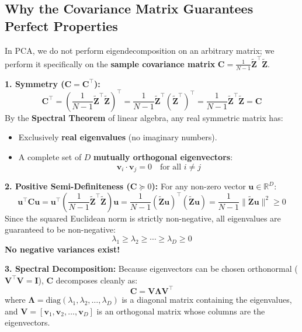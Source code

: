 \documentclass[11pt, a4paper]{article}
\begin{document}
\subsection{Why the Covariance Matrix Guarantees Perfect Properties}

In PCA, we do not perform eigendecomposition on an arbitrary matrix; we perform it specifically on the \textbf{sample covariance matrix} $\mathbf{C} = \frac{1}{N-1} \tilde{\mathbf{Z}}^\top \tilde{\mathbf{Z}}$.

\begin{defensebox}
\textbf{1. Symmetry ($\mathbf{C} = \mathbf{C}^\top$):}
$$\mathbf{C}^\top = \left(\frac{1}{N-1} \tilde{\mathbf{Z}}^\top \tilde{\mathbf{Z}}\right)^\top = \frac{1}{N-1} \tilde{\mathbf{Z}}^\top (\tilde{\mathbf{Z}}^\top)^\top = \frac{1}{N-1} \tilde{\mathbf{Z}}^\top \tilde{\mathbf{Z}} = \mathbf{C}$$
By the \textbf{Spectral Theorem} of linear algebra, any real symmetric matrix has:
\begin{itemize}[leftmargin=1.2em]
    \item Exclusively \textbf{real eigenvalues} (no imaginary numbers).
    \item A complete set of $D$ \textbf{mutually orthogonal eigenvectors}:
    $$\mathbf{v}_i \cdot \mathbf{v}_j = 0 \quad \text{for all } i \ne j$$
\end{itemize}

\textbf{2. Positive Semi-Definiteness ($\mathbf{C} \succeq 0$):}
For any non-zero vector $\mathbf{u} \in \mathbb{R}^D$:
$$\mathbf{u}^\top \mathbf{C} \mathbf{u} = \mathbf{u}^\top \left(\frac{1}{N-1} \tilde{\mathbf{Z}}^\top \tilde{\mathbf{Z}}\right) \mathbf{u} = \frac{1}{N-1} (\tilde{\mathbf{Z}}\mathbf{u})^\top (\tilde{\mathbf{Z}}\mathbf{u}) = \frac{1}{N-1} \|\tilde{\mathbf{Z}}\mathbf{u}\|^2 \ge 0$$
Since the squared Euclidean norm is strictly non-negative, all eigenvalues are guaranteed to be non-negative:
$$\lambda_1 \ge \lambda_2 \ge \cdots \ge \lambda_D \ge 0$$
\textbf{No negative variances exist!}

\textbf{3. Spectral Decomposition:}
Because eigenvectors can be chosen orthonormal ($\mathbf{V}^\top \mathbf{V} = \mathbf{I}$), $\mathbf{C}$ decomposes cleanly as:
$$\mathbf{C} = \mathbf{V} \boldsymbol{\Lambda} \mathbf{V}^\top$$
where $\boldsymbol{\Lambda} = \text{diag}(\lambda_1, \lambda_2, \ldots, \lambda_D)$ is a diagonal matrix containing the eigenvalues, and $\mathbf{V} = [\mathbf{v}_1, \mathbf{v}_2, \ldots, \mathbf{v}_D]$ is an orthogonal matrix whose columns are the eigenvectors.
\end{defensebox}
\end{document}
